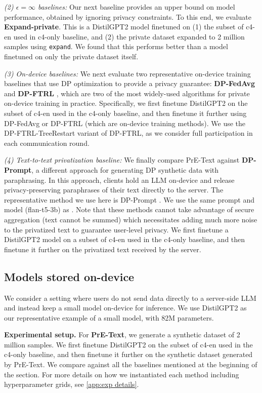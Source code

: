 \textit{(2) $\epsilon=\infty$ baselines:} Our next baseline provides an upper bound on model performance, obtained by ignoring privacy constraints. To this end, we evaluate \textbf{Expand-private}. 
This is a DistilGPT2 model finetuned on (1) the subset of c4-en used in c4-only baseline, and (2) the private dataset expanded to 2 million samples using \texttt{expand}. We found that this performs better than a model finetuned on only the private dataset itself.

\textit{(3) On-device baselines:} We next evaluate two representative on-device training baselines that use DP optimization to provide a privacy guarantee: \textbf{DP-FedAvg} \citep{mcmahan2017learning} and \textbf{DP-FTRL} \citep{kairouz2021practical}, which are two of the most widely-used algorithms for private on-device training in practice. Specifically, we first finetune DistilGPT2 on the subset of c4-en used in the c4-only baseline, and then finetune it further using DP-FedAvg or DP-FTRL (which are on-device training methods). We use the DP-FTRL-TreeRestart variant of DP-FTRL, as we consider full participation in each communication round.

\textit{(4) Text-to-text privatization baseline:} We finally compare PrE-Text against \textbf{DP-Prompt}, a different approach for generating DP synthetic data with paraphrasing. In this approach, clients hold an LLM on-device and release privacy-preserving paraphrases of their text directly to the server. The representative method we use here is DP-Prompt \citep{utpala-etal-2023-locally}. We use the same prompt and model (flan-t5-3b) as \citet{utpala-etal-2023-locally}. Note that these methods cannot take advantage of secure aggregation (text cannot be summed) which necessitates adding much more noise to the privatized text to guarantee user-level privacy. We first finetune a DistilGPT2 model on a subset of c4-en used in the c4-only baseline, and then finetune it further on the privatized text received by the server.
\subsection{Models stored on-device}
\label{sec:ondevice details}
\label{sec:ondevice}
We consider a setting where users do not send data directly to a server-side LLM and instead keep a small model on-device for inference.  We use DistilGPT2 as our representative example of a small model, with 82M parameters. 

\textbf{Experimental setup.}  For \textbf{PrE-Text}, we generate a synthetic dataset of 2 million samples. We first finetune DistilGPT2 on the subset of c4-en used in the c4-only baseline, and then finetune it further on the synthetic dataset generated by PrE-Text. We compare against all the baselines mentioned at the beginning of the section. For more details on how we instantiated each method including hyperparameter grids, see \cref{app:exp details}.

